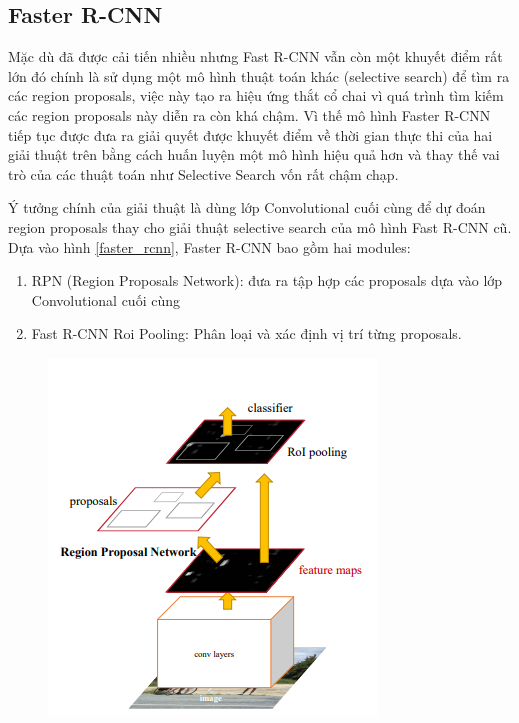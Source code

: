 \subsection{Faster R-CNN}
Mặc dù đã được cải tiến nhiều nhưng Fast R-CNN vẫn còn một khuyết điểm rất lớn đó chính là sử dụng một mô hình thuật toán khác (selective search) để tìm ra các region proposals, việc này tạo ra hiệu ứng thắt cổ chai vì quá trình tìm kiếm các region proposals này diễn ra còn khá chậm. Vì thế mô hình Faster R-CNN tiếp tục được đưa ra giải quyết được khuyết điểm về thời gian thực thi của hai giải thuật trên bằng cách huấn luyện một mô hình hiệu quả hơn và thay thế vai trò của các thuật toán như Selective Search vốn rất chậm chạp.

Ý tưởng chính của giải thuật là dùng lớp Convolutional cuối cùng để dự đoán region proposals thay cho giải thuật selective search của mô hình Fast R-CNN cũ. Dựa vào hình \ref{faster_rcnn}, Faster R-CNN bao gồm hai modules:
\begin{enumerate}
    \item RPN (Region Proposals Network): đưa ra tập hợp các proposals dựa vào lớp Convolutional cuối cùng
    \item Fast R-CNN Roi Pooling: Phân loại và xác định vị trí từng proposals.
\end{enumerate}
\begin{center}
    \begin{figure}[H]
    \centering
    \includegraphics[width=0.7\columnwidth]{images/chap2/Faster_Rcnn_1.png}
    \label{chap2:faster_rcnn}
    \end{figure}
\end{center}
